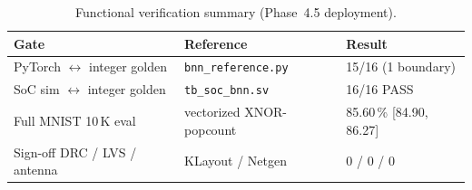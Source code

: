 \begin{table}[t]
  \centering
  \caption{Functional verification summary (Phase~4.5 deployment).}
  \label{tab:verification}
  \renewcommand{\arraystretch}{1.15}
  \begin{tabular}{@{}lll@{}}
    \toprule
    \textbf{Gate} & \textbf{Reference} & \textbf{Result} \\
    \midrule
    PyTorch $\leftrightarrow$ integer golden & \texttt{bnn\_reference.py} & 15/16 (1 boundary) \\
    SoC sim $\leftrightarrow$ integer golden & \texttt{tb\_soc\_bnn.sv}    & 16/16 PASS         \\
    Full MNIST 10\,K eval                    & vectorized XNOR-popcount    & 85.60\,\% [84.90, 86.27] \\
    Sign-off DRC / LVS / antenna             & KLayout / Netgen            & 0 / 0 / 0          \\
    \bottomrule
  \end{tabular}
\end{table}
